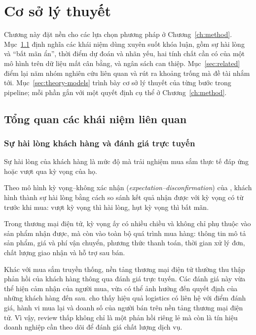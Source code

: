 \chapter{Cơ sở lý thuyết}\label{ch:theory}

Chương này đặt nền cho các lựa chọn phương pháp ở Chương~\ref{ch:method}. Mục~\ref{sec:concepts} định nghĩa các khái niệm dùng xuyên suốt khóa luận, gồm sự hài lòng và ``bất mãn ẩn'', thời điểm dự đoán và nhãn yếu, hai tính chất cần có của một mô hình trên dữ liệu mất cân bằng, và ngân sách can thiệp. Mục~\ref{sec:related} điểm lại năm nhóm nghiên cứu liên quan và rút ra khoảng trống mà đề tài nhắm tới. Mục~\ref{sec:theory-models} trình bày cơ sở lý thuyết của từng bước trong pipeline; mỗi phần gắn với một quyết định cụ thể ở Chương~\ref{ch:method}.

\section{Tổng quan các khái niệm liên quan}\label{sec:concepts}

\subsection{Sự hài lòng khách hàng và đánh giá trực tuyến}\label{sec:con-satisfaction}

Sự hài lòng của khách hàng là mức độ mà trải nghiệm mua sắm thực tế đáp ứng hoặc vượt qua kỳ vọng của họ. {\sloppy Theo mô hình kỳ vọng--không xác nhận (\emph{expectation--\allowbreak disconfirmation}) của \textcite{oliver1980}, khách hình thành sự hài lòng bằng cách so sánh kết quả nhận được với kỳ vọng có từ trước khi mua: vượt kỳ vọng thì hài lòng, hụt kỳ vọng thì bất mãn.\par} Trong thương mại điện tử, kỳ vọng ấy có nhiều chiều và không chỉ phụ thuộc vào sản phẩm nhận được, mà còn vào toàn bộ quá trình mua hàng: thông tin mô tả sản phẩm, giá và phí vận chuyển, phương thức thanh toán, thời gian xử lý đơn, chất lượng giao nhận và hỗ trợ sau bán.

Khác với mua sắm truyền thống, nền tảng thương mại điện tử thường thu thập phản hồi của khách hàng thông qua đánh giá trực tuyến. Các đánh giá này vừa thể hiện cảm nhận của người mua, vừa có thể ảnh hưởng đến quyết định của những khách hàng đến sau. \textcite{deshpande2023} cho thấy hiệu quả logistics có liên hệ với điểm đánh giá, hành vi mua lại và doanh số của người bán trên nền tảng thương mại điện tử. Vì vậy, review thấp không chỉ là một phản hồi riêng lẻ mà còn là tín hiệu doanh nghiệp cần theo dõi để đánh giá chất lượng dịch vụ.

